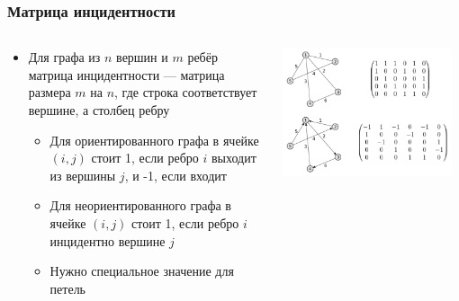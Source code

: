 \documentclass[xetex,mathserif,serif]{beamer}
\begin{document}
    \begin{frame}
        \frametitle{Матрица инцидентности}
        \begin{columns}
            \begin{column}{0.5\textwidth}
                \begin{itemize}
                    \item Для графа из $n$ вершин и $m$ ребёр матрица инцидентности --- матрица размера $m$ на $n$, где строка соответствует вершине, а столбец ребру
                    \begin{itemize}
                        \item Для ориентированного графа в ячейке $(i, j)$ стоит 1, если ребро $i$ выходит из вершины $j$, и -1, если входит
                        \item Для неориентированного графа в ячейке $(i, j)$ стоит 1, если ребро $i$ инцидентно вершине $j$
                        \item Нужно специальное значение для петель
                    \end{itemize}
                \end{itemize}
            \end{column}
            \begin{column}{0.5\textwidth}
                \begin{center}
                    \includegraphics[width=0.95\textwidth]{incidence-matrix.png}
                \end{center}
            \end{column}
        \end{columns}
    \end{frame}
\end{document}
